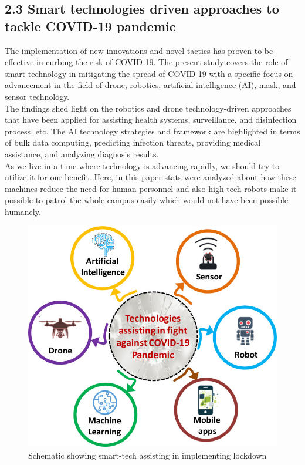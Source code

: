 \documentclass[eng]{FCEFyN-class}
\begin{document}
\subsection{2.3 Smart technologies driven approaches to tackle COVID-19 pandemic}
The implementation of new innovations and novel tactics has proven to be effective in curbing the risk of COVID-19. The present study covers the role of smart technology in mitigating the spread of COVID-19 with a specific focus on advancement in the field of drone, robotics, artificial intelligence (AI), mask, and sensor technology.\\ 

The findings shed light on the robotics and drone technology-driven approaches that have been applied for assisting health systems, surveillance, and disinfection process, etc. The AI technology strategies and framework are highlighted in terms of bulk data computing, predicting infection threats, providing medical assistance, and analyzing diagnosis results.\hypersetup{citecolor=red}\cite{Smart}\\

As we live in a time where technology is advancing rapidly, we should try to utilize it for our benefit. Here, in this paper stats were analyzed about how these machines reduce the need for human personnel and also high-tech robots make it possible to patrol the whole campus easily which would not have been possible humanely.


\begin{figure}
 \includegraphics[scale=0.4]{filesFCEFyN-class/pic12.jpg} 
 \caption{Schematic showing smart-tech assisting in implementing lockdown} \label{fig-2}
\FloatBarrier
\end{figure}
\end{document}
